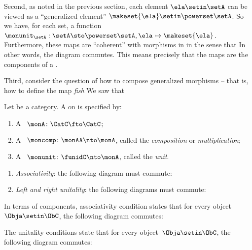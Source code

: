 {    Second, as noted in the previous section, each element $\ela \setin \setA$ can be viewed as a ``generalized element'' $\makeset{ \ela } \setin \powerset \setA$.
    So we have, for each set, a function $\monunit_\setA : \setA \sto \powerset \setA, \ela \mapsto \makeset{ \ela }$.
    Furthermore, these maps are ``coherent'' with morphisms in \Set in the sense that \XXX In other words, the diagram \XXX commutes.
    This means precisely that the maps \XXX are the components of a  \XXX .

    Third, consider the question of how to compose generalized morphisms -- that is, how to define the map \emph{fish} \XXX We saw that \XXX
}

\begin{ctdefinition}[Monad]
    \label{def:monad}
    Let \CatC be a category.
    A  on \CatC is specified by:\\
    \constit
    \begin{enumerate}
        \item A ~$ \monA \colon \CatC \fto \CatC$;
        \item A ~$\moncomp \colon \monAA \nto \monA$, called the \emph{composition} or \emph{multiplication};
        \item A ~$\monunit \colon \funidC \nto \monA$, called the \emph{unit}.
    \end{enumerate}
    \condit
    \begin{enumerate}
        \item \emph{Associativity}: the following diagram must commute:
        \item \emph{Left and right unitality}: the following diagrams must commute:
    \end{enumerate}
\end{ctdefinition}

\begin{remark}
    \label{rem:monad-condition-components}
    In terms of components, associativity condition states that for every object~$\Obja \setin \ObC$, the following diagram commutes:
    
    The unitality conditions state that for every object~$\Obja \setin \ObC$, the following diagram commutes:

\end{remark}

